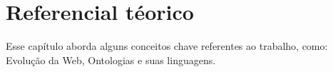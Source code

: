 \chapter{Referencial téorico}

Esse capítulo aborda alguns conceitos chave referentes ao trabalho, como: Evolução da
Web, Ontologias e suas linguagens.







